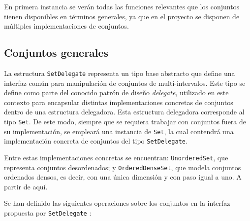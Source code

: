 En primera instancia se verán todas las funciones relevantes que los conjuntos tienen disponibles en términos generales, ya que en el proyecto se disponen de múltiples implementaciones de conjuntos.

\subsection{Conjuntos generales}


La estructura \texttt{SetDelegate} representa un tipo base abstracto que define una interfaz común para manipulación de conjuntos de multi-intervalos. Este tipo se define como parte del conocido patrón de diseño \textit{delegate}, utilizado en este contexto para encapsular distintas implementaciones concretas de conjuntos dentro de una estructura delegadora. Esta estructura delegadora corresponde al tipo \texttt{Set}. De este modo, siempre que se requiera trabajar con conjuntos fuera de su implementación, se empleará una instancia de \texttt{Set}, la cual contendrá una implementación concreta de conjuntos del tipo \texttt{SetDelegate}.


Entre estas implementaciones concretas se encuentran: \texttt{UnorderedSet}, que representa conjuntos desordenados; y \texttt{OrderedDenseSet}, que modela conjuntos ordenados densos, es decir, con una única dimensión y con paso igual a uno. A partir de aquí.


Se han definido las siguientes operaciones sobre los conjuntos en la interfaz propuesta por \texttt{SetDelegate} :

